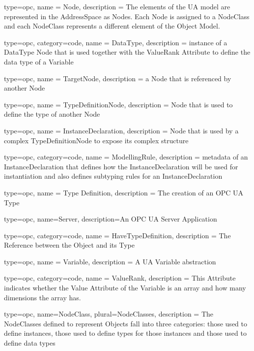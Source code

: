 
{
  type=opc,
  name = {Node},
  description = {The elements of the UA model are represented in the AddressSpace as Nodes. Each Node is assigned to a NodeClass and each NodeClass represents a different element of the Object Model.}
}

{
  type=opc,
  category=code,
  name = {DataType},
  description = {instance of a DataType Node that is used together with the ValueRank Attribute to define the data type of a Variable}
}

{
  type=opc,
  name = {TargetNode},
  description = {a Node that is referenced by another Node}
}

{
  type=opc,
  name = {TypeDefinitionNode},
  description = {Node that is used to define the type of another Node}
}


{
  type=opc,
  name = {InstanceDeclaration},
  description = {Node that is used by a complex \gls{TypeDefinitionNode} to expose its complex structure}
}

{
  type=opc,
  category=code,
  name = {ModellingRule},
  description = {metadata of an InstanceDeclaration that defines how the \gls{InstanceDeclaration} will be used for instantiation and also defines subtyping rules for an \gls{InstanceDeclaration}}
}

{
  type=opc,
  name = {Type Definition},
  description = {The creation of an OPC UA Type}
}

{
  type=opc,
  name=Server,
  description={An OPC UA Server Application}
}

{
  type=opc,
  category=code,
  name = {HaveTypeDefinition},
  description = {The \gls{Reference} between the \gls{Object} and its \gls{Type}}
}

{
  type=opc,
  name = {Variable},
  description = {A UA Variable abstraction}
}

{
  type=opc,
  category=code,
  name = {ValueRank},
  description = {This Attribute indicates whether the Value Attribute of the Variable is an array and how many dimensions the array has.}
}

{
  type=opc,
  name=NodeClass,
  plural=NodeClasses,
  description = {The NodeClasses defined to represent Objects fall into three categories: those used to define instances, those used to define types for those instances and those used to define data types}
}

